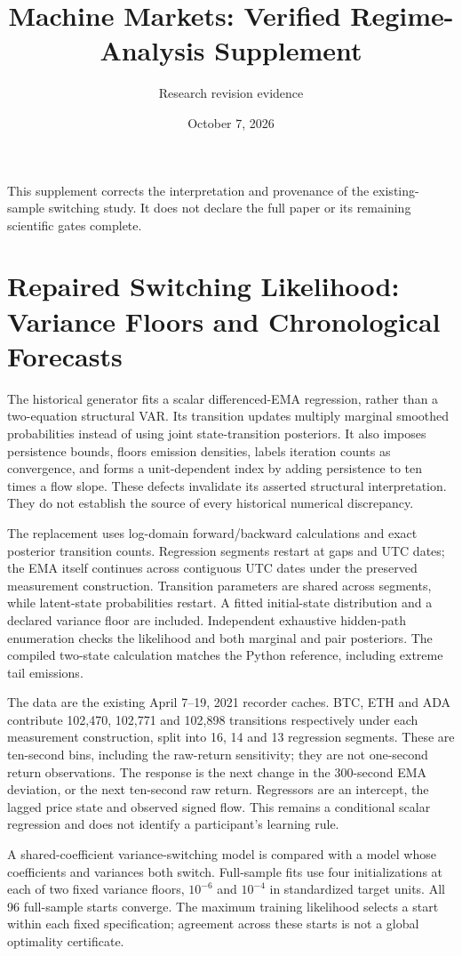 \documentclass[11pt]{article}
\title{Machine Markets: Verified Regime-Analysis Supplement}
\author{Research revision evidence}
\date{October 7, 2026}
\begin{document}
\maketitle
\noindent This supplement corrects the interpretation and provenance of the existing-sample switching study. It does not declare the full paper or its remaining scientific gates complete.

\section{Repaired Switching Likelihood: Variance Floors and Chronological Forecasts}
\label{sec:regime_repaired}
The historical generator fits a scalar differenced-EMA regression, rather than a two-equation structural VAR. Its transition updates multiply marginal smoothed probabilities instead of using joint state-transition posteriors. It also imposes persistence bounds, floors emission densities, labels iteration counts as convergence, and forms a unit-dependent index by adding persistence to ten times a flow slope. These defects invalidate its asserted structural interpretation. They do not establish the source of every historical numerical discrepancy.

The replacement uses log-domain forward/backward calculations and exact posterior transition counts. Regression segments restart at gaps and UTC dates; the EMA itself continues across contiguous UTC dates under the preserved measurement construction. Transition parameters are shared across segments, while latent-state probabilities restart. A fitted initial-state distribution and a declared variance floor are included. Independent exhaustive hidden-path enumeration checks the likelihood and both marginal and pair posteriors. The compiled two-state calculation matches the Python reference, including extreme tail emissions.

The data are the existing April 7--19, 2021 recorder caches. BTC, ETH and ADA contribute 102,470, 102,771 and 102,898 transitions respectively under each measurement construction, split into 16, 14 and 13 regression segments. These are ten-second bins, including the raw-return sensitivity; they are not one-second return observations. The response is the next change in the 300-second EMA deviation, or the next ten-second raw return. Regressors are an intercept, the lagged price state and observed signed flow. This remains a conditional scalar regression and does not identify a participant's learning rule.

A shared-coefficient variance-switching model is compared with a model whose coefficients and variances both switch. Full-sample fits use four initializations at each of two fixed variance floors, $10^{-6}$ and $10^{-4}$ in standardized target units. All 96 full-sample starts converge. The maximum training likelihood selects a start within each fixed specification; agreement across these starts is not a global optimality certificate.
\end{document}
